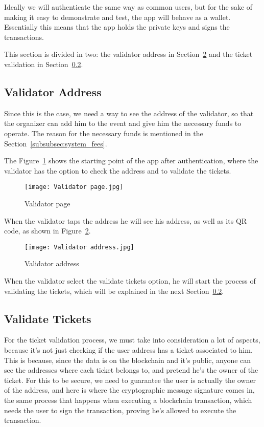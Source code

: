 Ideally we will authenticate the same way as common users, but for the sake of
making it easy to demonstrate and test, the app will behave as a wallet.
Essentially this means that the app holds the private keys and signs the
transactions.

This section is divided in two: the validator address in
Section~\ref{fig:validator_address} and the ticket validation in
Section~\ref{subsec:validate_tickets}.

\subsection{Validator Address}\label{subsec:validator_address}

Since this is the case, we need a way to see the address of the validator, so
that the organizer can add him to the event and give him the necessary funds to
operate. The reason for the necessary funds is mentioned in the
Section~\ref{subsubsec:system_fees}.

The Figure~\ref{fig:validator_page} shows the starting point of the app after
authentication, where the validator has the option to check the address and to
validate the tickets.

\begin{figure}[H]
	\texttt{[image: Validator page.jpg]}
	\centering
	\caption{Validator page}\label{fig:validator_page}
\end{figure}

When the validator taps the address he will see his address, as well as its QR
code, as shown in Figure~\ref{fig:validator_address}.

\begin{figure}[H]
	\texttt{[image: Validator address.jpg]}
	\centering
	\caption{Validator address}\label{fig:validator_address}
\end{figure}

When the validator select the validate tickets option, he will start the
process of validating the tickets, which will be explained in the next
Section~\ref{subsec:validate_tickets}.

\subsection{Validate Tickets}\label{subsec:validate_tickets}

For the ticket validation process, we must take into consideration a lot of
aspects, because it's not just checking if the user address has a ticket
associated to him. This is because, since the data is on the blockchain and
it's public, anyone can see the addresses where each ticket belongs to, and
pretend he's the owner of the ticket. For this to be secure, we need to
guarantee the user is actually the owner of the address, and here is where the
cryptographic message signature comes in, the same process that happens when
executing a blockchain transaction, which needs the user to sign the
transaction, proving he's allowed to execute the transaction.

